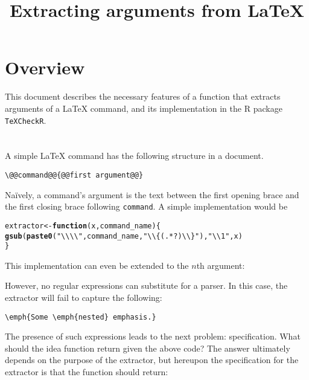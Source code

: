 \documentclass[b5paper]{scrartcl}\usepackage[]{graphicx}\usepackage[]{color}
\title{Extracting arguments from \LaTeX{}}
\makeatletter
\newcommand{\hlstr}[1]{\textcolor[rgb]{0.192,0.494,0.8}{#1}}%
\newcommand{\hlstd}[1]{\textcolor[rgb]{0.345,0.345,0.345}{#1}}%
\newcommand{\hlkwa}[1]{\textcolor[rgb]{0.161,0.373,0.58}{\textbf{#1}}}%
\newcommand{\hlkwb}[1]{\textcolor[rgb]{0.69,0.353,0.396}{#1}}%
\newcommand{\hlkwc}[1]{\textcolor[rgb]{0.333,0.667,0.333}{#1}}%
\newcommand{\hlkwd}[1]{\textcolor[rgb]{0.737,0.353,0.396}{\textbf{#1}}}%
\newenvironment{kframe}{%
 \def\at@end@of@kframe{}%
 \ifinner\ifhmode%
  \def\at@end@of@kframe{\end{minipage}}%
  \begin{minipage}{\columnwidth}%
 \fi\fi%
 \def\FrameCommand##1{\hskip\@totalleftmargin \hskip-\fboxsep
 \colorbox{shadecolor}{##1}\hskip-\fboxsep
     \hskip-\linewidth \hskip-\@totalleftmargin \hskip\columnwidth}%
 \MakeFramed {\advance\hsize-\width
   \@totalleftmargin\z@ \linewidth\hsize
   \@setminipage}}%
 {\par\unskip\endMakeFramed%
 \at@end@of@kframe}
\newenvironment{knitrout}{}{} %
\let\oldLaTeX\LaTeX
\renewcommand{\LaTeX}{\textrm{\oldLaTeX}}
\makeatother
\begin{document}
\section{Overview}
This document describes the necessary features of a function that extracts arguments of a \LaTeX{} command, 
and its implementation in the R package \lstinline!TeXCheckR!.

\section{}
A simple \LaTeX{} command has the following structure in a document.

\begin{lstlisting}
\@@command@@{@@first argument@@}
\end{lstlisting}

Na\"ively, a command's argument is the text between the first opening brace and the first closing brace following \lstinline!command!. 
A simple implementation would be

\begin{knitrout}\small
{}\color{fgcolor}\begin{kframe}
\begin{alltt}
\hlstd{extractor} \hlkwb{<-} \hlkwa{function}\hlstd{(}\hlkwc{x}\hlstd{,} \hlkwc{command_name}\hlstd{) \{}
  \hlkwd{gsub}\hlstd{(}\hlkwd{paste0}\hlstd{(}\hlstr{"\textbackslash{}\textbackslash{}\textbackslash{}\textbackslash{}"}\hlstd{, command_name,} \hlstr{"\textbackslash{}\textbackslash{}\{(.*?)\textbackslash{}\textbackslash{}\}"}\hlstd{),} \hlstr{"\textbackslash{}\textbackslash{}1"}\hlstd{, x)}
\hlstd{\}}
\end{alltt}
\end{kframe}
\end{knitrout}

This implementation can even be extended to the \(n\)th argument:

However, no regular expressions can substitute for a parser. 
In this case, the extractor will fail to capture the following:

\begin{lstlisting}
\emph{Some \emph{nested} emphasis.}
\end{lstlisting}

The presence of such expressions leads to the next problem: specification. 
What should the idea function return given the above code?
The answer ultimately depends on the purpose of the extractor, but hereupon the specification for the extractor is that the function should return:
\end{document}
